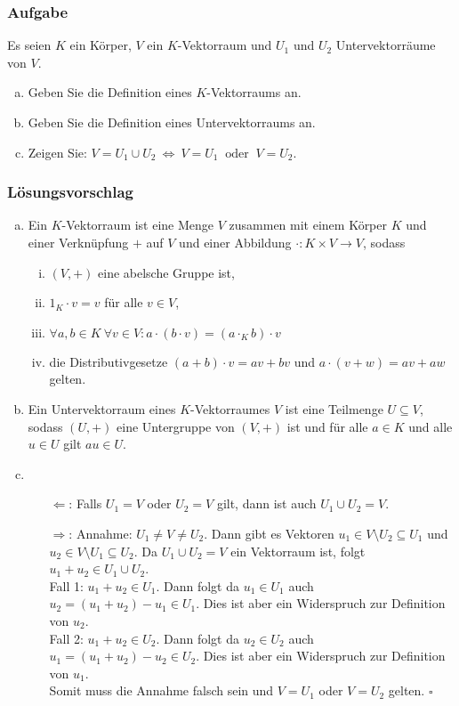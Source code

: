 \documentclass[a4paper,11pt]{scrartcl}
\newcounter{auf}
\newcommand{\Aufgabe}%
        {\addtocounter{auf}{1} \subsubsection*{\rmfamily  Aufgabe \theauf \hspace{1em}} }
\begin{document}
\newpage
\Aufgabe

Es seien $K$ ein Körper, $V$ ein $K$-Vektorraum und $U_1$ und $U_2$
Untervektorräume von $V.$

\begin{enumerate}[a)]
\item Geben Sie die Definition eines $K$-Vektorraums an.
\item Geben Sie die Definition eines Untervektorraums an.
\item Zeigen Sie: $V=U_1\cup U_2  \ \Longleftrightarrow \ V=U_1\ \text{ oder }\ V=U_2.$
\end{enumerate}

\subsubsection*{Lösungsvorschlag}
\begin{enumerate}[a)]
\item Ein $K$-Vektorraum ist eine Menge $V$ zusammen mit einem Körper $K$ und einer Verknüpfung $+$ auf $V$ und einer Abbildung $\cdot:K\times V \to V$, sodass
\begin{enumerate}[i)]
\item $(V,+)$ eine abelsche Gruppe ist,
\item $1_K\cdot v=v$ für alle $v\in V$,
\item $\forall a,b \in K \ \forall v \in V: a\cdot (b \cdot v)=(a\cdot_K b)\cdot v$
\item die Distributivgesetze $(a+b)\cdot v=av+bv$ und $a\cdot (v+w)=av+aw$ gelten.
\end{enumerate}
\item Ein Untervektorraum eines $K$-Vektorraumes $V$ ist eine Teilmenge $U \subseteq V$, sodass $(U,+)$ eine Untergruppe von $(V,+)$ ist und für alle $a\in K$ und alle $u\in U$ gilt $au \in U$.
\item 
\begin{itemize}
\item[$\Leftarrow$:] Falls $U_1=V$ oder $U_2=V$ gilt, dann ist auch $U_1\cup U_2=V$.
\item[$\Rightarrow$:] Annahme: $U_1\ne V \ne U_2$. Dann gibt es Vektoren $u_1 \in V\setminus U_2 \subseteq U_1$ und $u_2 \in V\setminus U_1 \subseteq U_2$. Da $U_1 \cup U_2=V$ ein Vektorraum ist, folgt $u_1+u_2 \in U_1\cup U_2$.\\
Fall 1: $u_1+u_2 \in U_1$. Dann folgt da $u_1 \in U_1$ auch $u_2=(u_1+u_2)-u_1 \in U_1$. Dies ist aber ein Widerspruch zur Definition von $u_2$.\\
Fall 2: $u_1+u_2 \in U_2$. Dann folgt da $u_2 \in U_2$ auch $u_1=(u_1+u_2)-u_2 \in U_2$. Dies ist aber ein Widerspruch zur Definition von $u_1$.\\
Somit muss die Annahme falsch sein und $V=U_1$ oder $V=U_2$ gelten. \hfill $\square$
\end{itemize}
\end{enumerate}
\end{document}
